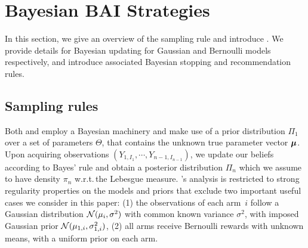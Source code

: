 \section{Bayesian BAI Strategies}\label{sec:t3c.algorithm}

In this section, we give an overview of the sampling rule \TTTS and introduce \TCC. We provide details for Bayesian updating for Gaussian and Bernoulli models respectively, and introduce associated Bayesian stopping and recommendation rules. 

\subsection{Sampling rules}

Both \TTTS and \TCC employ a Bayesian machinery and make use of a prior distribution $\Pi_1$ over a set of parameters $\Theta$, that contains the unknown true parameter vector ${\boldsymbol \mu}$. Upon acquiring observations $(Y_{1,I_1},\cdots,Y_{n-1,I_{n-1}})$, we update our beliefs according to Bayes' rule and obtain a posterior distribution $\Pi_{n}$ which we assume to have density $\pi_n$ w.r.t.\,the Lebesgue measure. %
\citeauthor{russo2016ttts}'s analysis is restricted to strong regularity properties on the models and priors that exclude two important useful cases we consider in this paper: (1) the observations of each arm~$i$ follow a Gaussian distribution $\mathcal{N}(\mu_i,\sigma^2)$ with common known variance $\sigma^2$, with imposed Gaussian prior $\mathcal{N}(\mu_{1,i},\sigma_{1,i}^2)$, (2) all arms receive Bernoulli rewards with unknown means, with a uniform prior on each arm.

